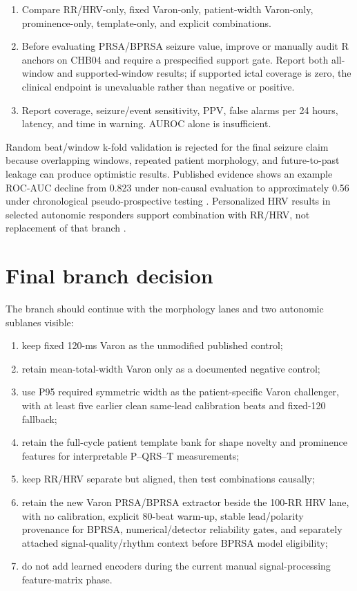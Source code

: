 \documentclass[11pt,a4paper]{article}
\begin{document}
\begin{enumerate}
  \item Compare RR/HRV-only, fixed Varon-only, patient-width Varon-only, prominence-only, template-only, and explicit combinations.
  \item Before evaluating PRSA/BPRSA seizure value, improve or manually audit R anchors on CHB04 and require a prespecified support gate. Report both all-window and supported-window results; if supported ictal coverage is zero, the clinical endpoint is unevaluable rather than negative or positive.
  \item Report coverage, seizure/event sensitivity, PPV, false alarms per 24 hours, latency, and time in warning. AUROC alone is insufficient.
\end{enumerate}

Random beat/window k-fold validation is rejected for the final seizure claim because overlapping windows, repeated patient morphology, and future-to-past leakage can produce optimistic results. Published evidence shows an example ROC-AUC decline from 0.823 under non-causal evaluation to approximately 0.56 under chronological pseudo-prospective testing \cite{kalousios}. Personalized HRV results in selected autonomic responders support combination with RR/HRV, not replacement of that branch \cite{jeppesen}.

\section{Final branch decision}

The branch should continue with the morphology lanes and two autonomic sublanes visible:

\begin{enumerate}
  \item keep fixed 120-ms Varon as the unmodified published control;
  \item retain mean-total-width Varon only as a documented negative control;
  \item use P95 required symmetric width as the patient-specific Varon challenger, with at least five earlier clean same-lead calibration beats and fixed-120 fallback;
  \item retain the full-cycle patient template bank for shape novelty and prominence features for interpretable P--QRS--T measurements;
  \item keep RR/HRV separate but aligned, then test combinations causally;
  \item retain the new Varon PRSA/BPRSA extractor beside the 100-RR HRV lane, with no calibration, explicit 80-beat warm-up, stable lead/polarity provenance for BPRSA, numerical/detector reliability gates, and separately attached signal-quality/rhythm context before BPRSA model eligibility;
  \item do not add learned encoders during the current manual signal-processing feature-matrix phase.
\end{enumerate}
\end{document}
